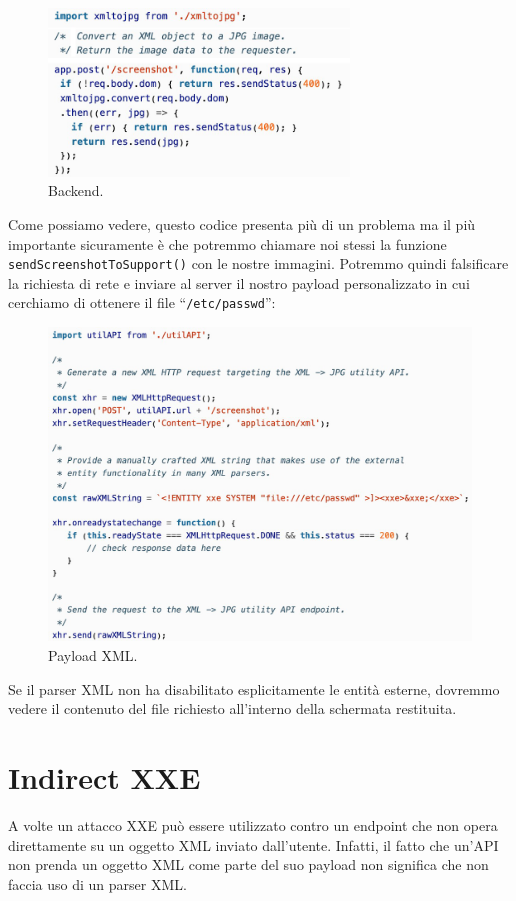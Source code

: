 \begin{figure}[H]
	\centering
	\includegraphics[width=8cm, keepaspectratio]{capitoli/web_security/imgs/xxe_banca_4.png}
	\caption{Backend.}
	\label{fig:xxe_banca_4}
\end{figure}

Come possiamo vedere, questo codice presenta più di un problema ma il più importante sicuramente è che potremmo chiamare noi stessi la funzione \verb|sendScreenshotToSupport()| con le nostre immagini. Potremmo quindi falsificare la richiesta di rete e inviare al server il nostro payload personalizzato in cui cerchiamo di ottenere il file ``\verb|/etc/passwd|'':
\begin{figure}[H]
	\centering
	\includegraphics[width=12cm, keepaspectratio]{capitoli/web_security/imgs/xxe_banca_5.png}
	\caption{Payload XML.}
	\label{fig:xxe_banca_5}
\end{figure}

Se il parser XML non ha disabilitato esplicitamente le entità esterne, dovremmo vedere il contenuto del file richiesto all'interno della schermata restituita.

\newpage

\section{Indirect XXE}
A volte un attacco XXE può essere utilizzato contro un
endpoint che non opera direttamente su un oggetto XML
inviato dall'utente. Infatti, il fatto che un'API non prenda un oggetto XML come parte del suo payload non significa che non faccia uso di un parser XML.\\

